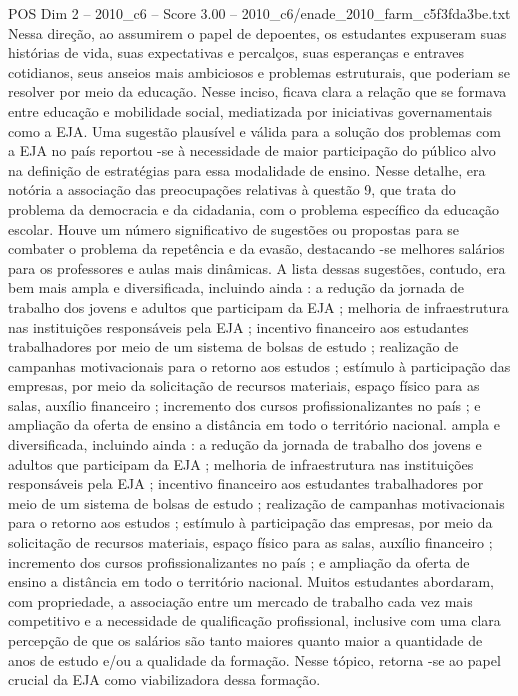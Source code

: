 \begin{textsample}{POS Dim 2 – 2010\_c6 – Score 3.00 – 2010\_c6/enade\_2010\_farm\_c5f3fda3be.txt}
Nessa direção, ao assumirem o papel de depoentes, os estudantes expuseram suas histórias de vida, suas expectativas e percalços, suas esperanças e entraves cotidianos, seus anseios mais ambiciosos e problemas estruturais, que poderiam se resolver por meio da educação.
Nesse inciso, ficava clara a relação que se formava entre educação e mobilidade social, mediatizada por iniciativas governamentais como a EJA.
Uma sugestão plausível e válida para a solução dos problemas com a EJA no país reportou -se à necessidade de maior participação do público alvo na definição de estratégias para essa modalidade de ensino.
Nesse detalhe, era notória a associação das preocupações relativas à questão 9, que trata do problema da democracia e da cidadania, com o problema específico da educação escolar.
Houve um número significativo de sugestões ou propostas para se combater o problema da repetência e da evasão, destacando -se melhores salários para os professores e aulas mais dinâmicas.
A lista dessas sugestões, contudo, era bem mais ampla e diversificada, incluindo ainda : a redução da jornada de trabalho dos jovens e adultos que participam da EJA ; melhoria de infraestrutura nas instituições responsáveis pela EJA ; incentivo financeiro aos estudantes trabalhadores por meio de um sistema de bolsas de estudo ; realização de campanhas motivacionais para o retorno aos estudos ; estímulo à participação das empresas, por meio da solicitação de recursos materiais, espaço físico para as salas, auxílio financeiro ; incremento dos cursos profissionalizantes no país ; e ampliação da oferta de ensino a distância em todo o território nacional. ampla e diversificada, incluindo ainda : a redução da jornada de trabalho dos jovens e adultos que participam da EJA ; melhoria de infraestrutura nas instituições responsáveis pela EJA ; incentivo financeiro aos estudantes trabalhadores por meio de um sistema de bolsas de estudo ; realização de campanhas motivacionais para o retorno aos estudos ; estímulo à participação das empresas, por meio da solicitação de recursos materiais, espaço físico para as salas, auxílio financeiro ; incremento dos cursos profissionalizantes no país ; e ampliação da oferta de ensino a distância em todo o território nacional.
Muitos estudantes abordaram, com propriedade, a associação entre um mercado de trabalho cada vez mais competitivo e a necessidade de qualificação profissional, inclusive com uma clara percepção de que os salários são tanto maiores quanto maior a quantidade de anos de estudo e/ou a qualidade da formação.
Nesse tópico, retorna -se ao papel crucial da EJA como viabilizadora dessa formação.

\end{textsample}

